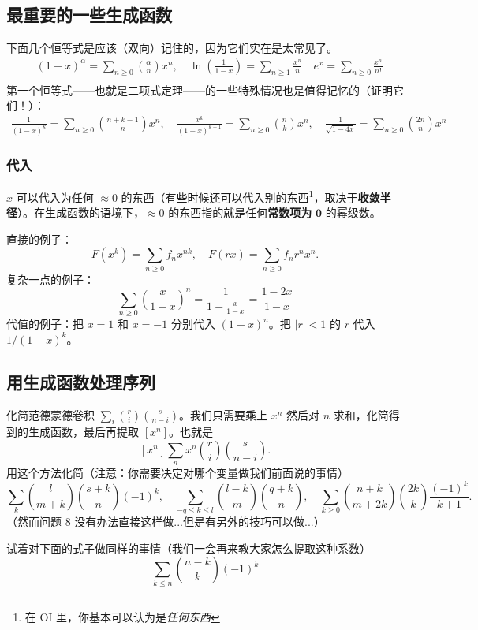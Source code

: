 \subsection{最重要的一些生成函数}
    下面几个恒等式是应该（双向）记住的，因为它们实在是太常见了。
    $$
    \begin{aligned}
    &(1+x)^{\alpha}=\sum_{n\ge 0}\binom{\alpha}{n}x^n,\quad \ln\left(\frac{1}{1-x}\right)=\sum_{n\ge 1}\frac{x^n}{n}\quad e^x=\sum_{n\ge 0}\frac{x^n}{n!}\\
    \end{aligned}
    $$
    第一个恒等式——也就是二项式定理——的一些特殊情况也是值得记忆的（证明它们！）：
    $$
    \begin{aligned}
    \frac{1}{(1-x)^k}=\sum_{n\ge 0}\binom{n+k-1}{n}x^n,\quad\frac{x^k}{(1-x)^{k+1}}=\sum_{n\ge 0}\binom{n}{k}x^n,\quad \frac{1}{\sqrt{1-4x}}=\sum_{n\ge 0}\binom{2n}{n}x^n
    \end{aligned}
    $$

\subsubsection{代入}
    $x$ 可以代入为任何 $\approx 0$ 的东西（有些时候还可以代入别的东西\footnote{在 OI 里，你基本可以认为是\textit{任何东西}}，取决于\textbf{收敛半径}）。在生成函数的语境下，$\approx 0$ 的东西指的就是任何\textbf{常数项为} $\mathbf 0$ 的幂级数。

    直接的例子：
    $$
    F(x^k)=\sum_{n\ge 0}f_nx^{nk},\quad F(rx)=\sum_{n\ge 0}f_nr^nx^n.
    $$
    复杂一点的例子：
    $$
    \sum_{n\ge 0}\left(\frac{x}{1-x}\right)^n=\frac{1}{1-\frac{x}{1-x}}=\frac{1-2x}{1-x}
    $$
    代值的例子：把 $x=1$ 和 $x=-1$ 分别代入 $(1+x)^n$。把 $|r|<1$ 的 $r$ 代入 $1/(1-x)^k$。 

\subsection{用生成函数处理序列}
    化简范德蒙德卷积 $\sum_i\binom{r}{i}\binom{s}{n-i}$。我们只需要乘上 $x^n$ 然后对 $n$ 求和，化简得到的生成函数，最后再提取 $[x^n]$。也就是
    $$
    [x^n]\sum_n x^n\binom{r}{i}\binom{s}{n-i}.
    $$
    用这个方法化简（注意：你需要决定对哪个变量做我们前面说的事情）
    $$
    \sum_{k}\binom{l}{m+k}\binom{s+k}{n}(-1)^k,\quad \sum_{-q\le k\le l}\binom{l-k}{m}\binom{q+k}{n},\quad     \sum_{k\ge 0}\binom{n+k}{m+2k}\binom{2k}{k}\frac{(-1)^k}{k+1}.
    $$
    （然而问题 8 没有办法直接这样做...但是有另外的技巧可以做...）
    
    试着对下面的式子做同样的事情（我们一会再来教大家怎么提取这种系数）
    $$
    \sum_{k\le n}\binom{n-k}{k}(-1)^k
    $$

